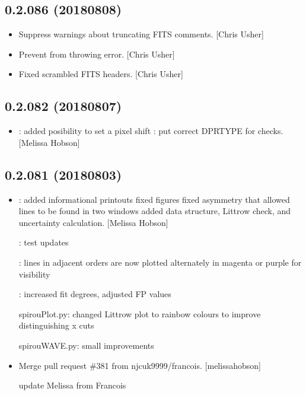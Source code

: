 \documentclass[a4paper,10pt,english]{report}
\begin{document}
\subsection{0.2.086 (2018\sphinxhyphen{}08\sphinxhyphen{}08)}
\label{\detokenize{misc/changelog:id399}}\begin{itemize}
\item {} 
Suppress warnings about truncating FITS comments. {[}Chris Usher{]}

\item {} 
Prevent  from throwing error. {[}Chris
Usher{]}

\item {} 
Fixed scrambled FITS headers. {[}Chris Usher{]}

\end{itemize}


\subsection{0.2.082 (2018\sphinxhyphen{}08\sphinxhyphen{}07)}
\label{\detokenize{misc/changelog:id400}}\begin{itemize}
\item {} 
: added posibility to set a pixel shift
: put correct DPRTYPE for  checks. {[}Melissa
Hobson{]}

\end{itemize}


\subsection{0.2.081 (2018\sphinxhyphen{}08\sphinxhyphen{}03)}
\label{\detokenize{misc/changelog:id401}}\begin{itemize}
\item {} 
: \sphinxhyphen{} added informational printouts \sphinxhyphen{} fixed
figures \sphinxhyphen{} fixed asymmetry that allowed lines to be found in two
windows \sphinxhyphen{} added  data structure, Littrow check, and
uncertainty calculation. {[}Melissa Hobson{]}

: test updates

: lines in adjacent orders are now plotted alternately in magenta or purple for visibility

: increased fit degrees, adjusted FP values

spirouPlot.py: changed Littrow plot to rainbow colours to improve distinguishing x cuts

spirouWAVE.py: small improvements

\item {} 
Merge pull request \#381 from njcuk9999/francois. {[}melissa\sphinxhyphen{}hobson{]}

update Melissa from Francois

\end{itemize}
\end{document}
